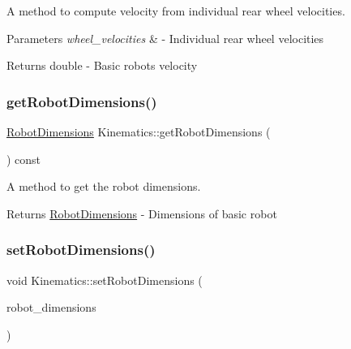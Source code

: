 A method to compute velocity from individual rear wheel velocities. 


\begin{DoxyParams}{Parameters}
{\em wheel\+\_\+velocities} & -\/ Individual rear wheel velocities \\
\hline
\end{DoxyParams}
\begin{DoxyReturn}{Returns}
double -\/ Basic robot\textquotesingle{}s velocity 
\end{DoxyReturn}
\mbox{\label{classKinematics_a8f16185dd4942d6423d3ac4997de839f}} 
\subsubsection{\texorpdfstring{get\+Robot\+Dimensions()}{getRobotDimensions()}}
{\footnotesize\ttfamily \hyperlink{structRobotDimensions}{Robot\+Dimensions} Kinematics\+::get\+Robot\+Dimensions (\begin{DoxyParamCaption}{ }\end{DoxyParamCaption}) const}



A method to get the robot dimensions. 

\begin{DoxyReturn}{Returns}
\hyperlink{structRobotDimensions}{Robot\+Dimensions} -\/ Dimensions of basic robot 
\end{DoxyReturn}
\mbox{\label{classKinematics_aee778602a6079e9ac4db804b6b3e4547}} 
\subsubsection{\texorpdfstring{set\+Robot\+Dimensions()}{setRobotDimensions()}}
{\footnotesize\ttfamily void Kinematics\+::set\+Robot\+Dimensions (\begin{DoxyParamCaption}\item[{const \hyperlink{structRobotDimensions}{Robot\+Dimensions} \&}]{robot\+\_\+dimensions }\end{DoxyParamCaption})}




